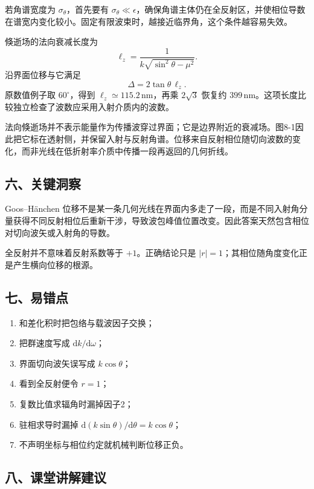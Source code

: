 \documentclass[12pt,a4paper,UTF8]{ctexart}
\newcommand{\tightlist}{\setlength{\itemsep}{0pt}\setlength{\parskip}{0pt}}
\begin{document}
若角谱宽度为 \(\sigma_\theta\)，首先要有
\(\sigma_\theta\ll\epsilon\)，确保角谱主体仍在全反射区，并使相位导数在谱宽内变化较小。固定有限波束时，越接近临界角，这个条件越容易失效。

倏逝场的法向衰减长度为 \[
\ell_z=\frac1{k\sqrt{\sin^2\theta-\mu^2}}.
\] 沿界面位移与它满足 \[
\Delta=2\tan\theta\,\ell_z.
\] 原数值例子取 \(60^\circ\)，得到
\(\ell_z\simeq115.2\,\mathrm{nm}\)，再乘 \(2\sqrt3\) 恢复约
\(399\,\mathrm{nm}\)。这项长度比较独立检查了波数应采用入射介质内的波数。

法向倏逝场并不表示能量作为传播波穿过界面；它是边界附近的衰减场。图8-1因此把它标在透射侧，并保留入射与反射角谱。位移来自反射相位随切向波数的变化，而非光线在低折射率介质中传播一段再返回的几何折线。

\subsection{六、关键洞察}\label{ux516dux5173ux952eux6d1eux5bdf-7}

Goos--Hänchen
位移不是某一条几何光线在界面内多走了一段，而是不同入射角分量获得不同反射相位后重新干涉，导致波包峰值位置改变。因此答案天然包含相位对切向波矢或入射角的导数。

全反射并不意味着反射系数等于 \(+1\)。正确结论只是
\(|r|=1\)；其相位随角度变化正是产生横向位移的根源。

\subsection{七、易错点}\label{ux4e03ux6613ux9519ux70b9-7}

\begin{enumerate}
\def\labelenumi{\arabic{enumi}.}
\tightlist
\item
  和差化积时把包络与载波因子交换；
\item
  把群速度写成 \(\mathrm dk/\mathrm d\omega\)；
\item
  界面切向波矢误写成 \(k\cos\theta\)；
\item
  看到全反射便令 \(r=1\)；
\item
  复数比值求辐角时漏掉因子2；
\item
  驻相求导时漏掉
  \(\mathrm d(k\sin\theta)/\mathrm d\theta=k\cos\theta\)；
\item
  不声明坐标与相位约定就机械判断位移正负。
\end{enumerate}

\subsection{八、课堂讲解建议}\label{ux516bux8bfeux5802ux8bb2ux89e3ux5efaux8bae-7}
\end{document}
